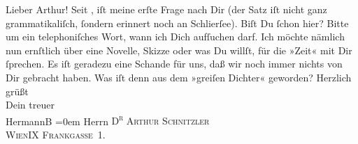 \begin{ledgroupsized}[t]{13cm}
           \pstart\center{}Lieber Arthur! \pend\pstart
           Seit \label{K_L00583-1v}\label{K_L00583-1h}, iſt meine erſte Frage nach Dir (der Satz iſt nicht ganz
               grammatikaliſch, ſondern erinnert noch an Schlierſee). Biſt Du ſchon hier? Bitte um ein telephoniſches Wort, wann ich
               Dich aufſuchen darf. Ich möchte nämlich nun ernſtlich über eine Novelle, Skizze oder
               was Du {\pb}willſt, für die »Zeit« mit Dir ſprechen. Es iſt geradezu eine Schande für uns, daß
               wir noch immer nichts von Dir gebracht haben. Was iſt denn aus dem »greiſen Dichter« geworden?\pend
           \pstart
           Herzlich grüßt{\\[\baselineskip]}Dein treuer{\\[\baselineskip]}\spacefill\mbox{HermannB}\pend
           \leftskip=0em{}\pstart
           \noindent{}Herrn \textsc{D\textsuperscript{r} Arthur Schnitzler}{\\}\textsc{WienIX Frankgasse 1}.\pend
           \pstart
           \textcolor{gray}{\textbf{\label{T_L00583-1v}\label{T_L00583-1h}}}\pend
           
         
         \endnumbering{}\end{ledgroupsized}  \newcommand{\dateiname}{L00583}\newcommand{\titel}{Hermann Bahr an Arthur Schnitzler, 2. 9. 1896}\newcommand{\editorInnen}{ Kurt Ifkovits,  Martin Anton Müller}
      